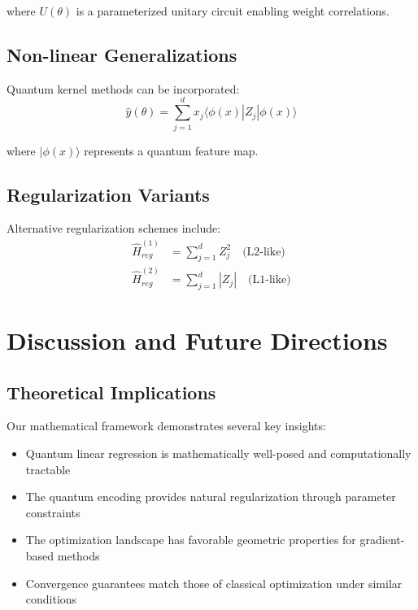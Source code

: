 \documentclass[11pt]{article}
\begin{document}
where $U(\theta)$ is a parameterized unitary circuit enabling weight correlations.

\subsection{Non-linear Generalizations}

Quantum kernel methods can be incorporated:
\begin{equation}
\hat{y}(\theta) = \sum_{j=1}^d x_j \langle \phi(x) | Z_j | \phi(x) \rangle
\end{equation}

where $|\phi(x)\rangle$ represents a quantum feature map.

\subsection{Regularization Variants}

Alternative regularization schemes include:
\begin{align}
\hat{H}_{reg}^{(1)} &= \sum_{j=1}^d Z_j^2 \quad \text{(L2-like)} \\
\hat{H}_{reg}^{(2)} &= \sum_{j=1}^d |Z_j| \quad \text{(L1-like)}
\end{align}

\section{Discussion and Future Directions}

\subsection{Theoretical Implications}

Our mathematical framework demonstrates several key insights:

\begin{itemize}
\item Quantum linear regression is mathematically well-posed and computationally tractable
\item The quantum encoding provides natural regularization through parameter constraints
\item The optimization landscape has favorable geometric properties for gradient-based methods
\item Convergence guarantees match those of classical optimization under similar conditions
\end{itemize}
\end{document}

